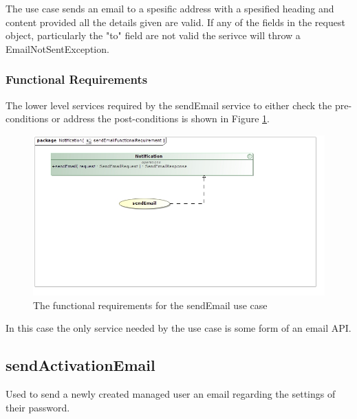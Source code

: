 The use case sends an email to a spesific address with a spesified heading and content
provided all the details given are valid. If any of the fields in the request object,
particularly the "to" field are not valid the serivce will throw a EmailNotSentException.

\subsubsection{Functional Requirements}
The lower level services required by the sendEmail service to either check the
pre-conditions or address the post-conditions is shown in Figure
\ref{sendEmailFunctionalRequirements}.
\begin{figure}[H]
	\begin{center}
		\includegraphics[scale=0.7]{../Diagrams and Charts/Notifications/sendEmailFunctionalRequirement.jpg}
		\caption{The functional requirements for the sendEmail use case}
	\end{center}
	\label{sendEmailFunctionalRequirements}
\end{figure}

In this case the only service needed by the use case is some form of an email
API.

\subsection{sendActivationEmail}
Used to send a newly created managed user an email regarding the settings of
their password.

